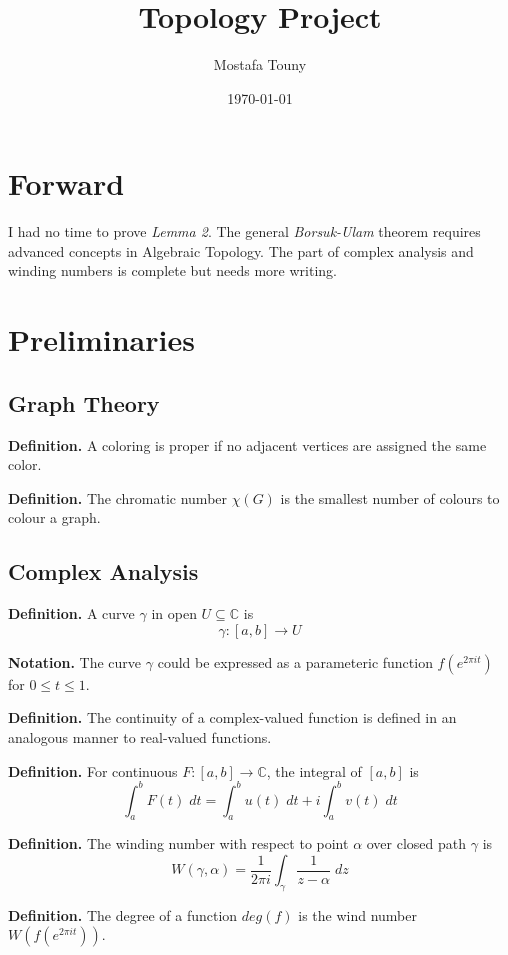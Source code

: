 \documentclass[12pt]{extarticle}
\title{Topology Project}
\author{Mostafa Touny}
\date{\today}
\begin{document}
\maketitle
\tableofcontents

\newpage

\section{Forward}
I had no time to prove \textit{Lemma 2}. The general \textit{Borsuk-Ulam} theorem requires advanced concepts in Algebraic Topology. The part of complex analysis and winding numbers is complete but needs more writing.


\section{Preliminaries}

\subsection{Graph Theory}

\textbf{Definition.} A coloring is proper if no adjacent vertices are assigned the same color.

\textbf{Definition.} The chromatic number $\chi(G)$ is the smallest number of colours to colour a graph.


\subsection{Complex Analysis}

\textbf{Definition.} A curve $\gamma$ in open $U \subseteq \mathbb{C}$ is
$$
\gamma: [a,b] \rightarrow U
$$

\textbf{Notation.} The curve $\gamma$ could be expressed as a parameteric function $f(e^{2 \pi i t})$ for $0 \leq t \leq 1$.

\textbf{Definition.} The continuity of a complex-valued function is defined in an analogous manner to real-valued functions.

\textbf{Definition.} For continuous $F:[a,b] \rightarrow \mathbb{C}$, the integral of $[a,b]$ is
$$
\int_a^b F(t) \; dt = \int_a^b u(t) \; dt + i \int_a^b v(t) \; dt
$$

\textbf{Definition.} The winding number with respect to point $\alpha$ over closed path $\gamma$ is
$$
W(\gamma,\alpha) = \frac{1}{2 \pi i} \int_\gamma \frac{1}{z - \alpha} \; dz
$$

\textbf{Definition.} The degree of a function $deg(f)$ is the wind number $W(f(e^{2 \pi it}))$.
\end{document}
